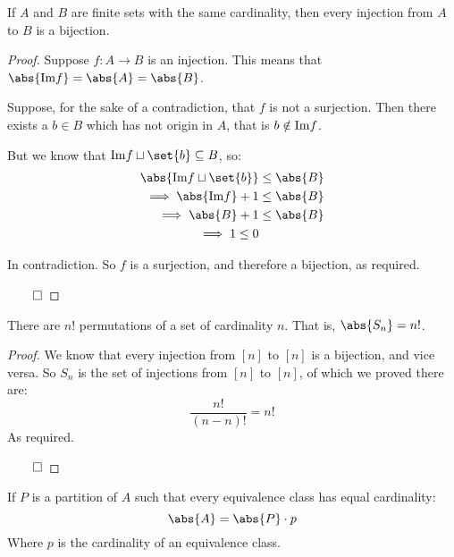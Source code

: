 \def\image{{\rm Im}}
\begin{lemm*}

	If $A$ and $B$ are finite sets with the same cardinality, then every injection from $A$ to $B$ is a bijection.

\end{lemm*}

\begin{proof}

	Suppose $f\colon A\longrightarrow B$ is an injection.
	This means that $\abs{\image f}=\abs{A}=\abs{B}$. 

	Suppose, for the sake of a contradiction, that $f$ is not a surjection.
	Then there exists a $b\in B$ which has not origin in $A$, that is $b\notin\image f$.

	But we know that $\image f\sqcup\set{b}\subseteq B$, so:
	\begin{align*}
		\abs{\image f\sqcup\set{b}} &\leq \abs{B} \\
		\implies \abs{\image f}+1 &\leq \abs{B} \\
		\implies \abs{B}+1 &\leq \abs{B} \\
		\implies 1\leq 0
	\end{align*}

	In contradiction.
	So $f$ is a surjection, and therefore a bijection, as required.

\hfill$\qed$

\end{proof}

\begin{thrm*}

	There are $n!$ permutations of a set of cardinality $n$. That is, $\abs{S_n}=n!$.

\end{thrm*}

\begin{proof}

	We know that every injection from $[n]$ to $[n]$ is a bijection, and vice versa.
	So $S_n$ is the set of injections from $[n]$ to $[n]$, of which we proved there are:
	\[ \frac{n!}{(n-n)!} = n! \]
	As required.

\hfill$\qed$

\end{proof}

\newpage
\begin{lemm*}[partCardLemma]

	If $P$ is a partition of $A$ such that every equivalence class has equal cardinality:
	\[ \abs{A} = \abs{P}\cdot p \]
	Where $p$ is the cardinality of an equivalence class.

\end{lemm*}


